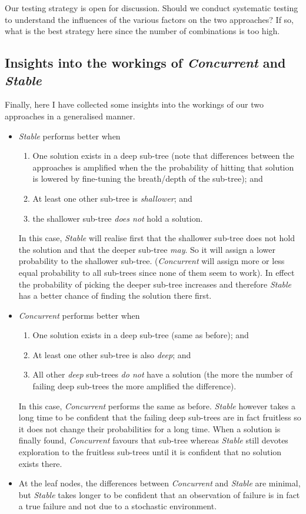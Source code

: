 \documentclass[a4paper]{article}
\newcommand{\cc}{\emph{Concurrent}\xspace}
\newcommand{\st}{\emph{Stable}\xspace}
\begin{document}
Our testing strategy is open for discussion. Should we conduct systematic testing to understand the influences of the various factors on the two approaches? If so, what is the best strategy here since the number of combinations is too high.

\subsection{Insights into the workings of \cc and \st}

Finally, here I have collected some insights into the workings of our two approaches in a generalised manner.

\begin{itemize}
\item \st performs better when
\begin{enumerate}
\item One solution exists in a deep sub-tree (note that differences between the approaches is amplified when the the probability of hitting that solution is lowered by fine-tuning the breath/depth of the sub-tree); and
\item At least one other sub-tree is \emph{shallower}; and
\item the shallower sub-tree \emph{does not} hold a solution.
\end{enumerate}

In this case, \st will realise first that the shallower sub-tree does not hold the solution and that the deeper sub-tree \emph{may}. So it will assign a lower probability to the shallower sub-tree. (\cc will assign more or less equal probability to all sub-trees since none of them seem to work). In effect the probability of picking the deeper sub-tree increases and therefore \st has a better chance of finding the solution there first.

\item \cc performs better when
\begin{enumerate}
\item One solution exists in a deep sub-tree (same as before); and
\item At least one other sub-tree is also \emph{deep}; and
\item All other \emph{deep} sub-trees \emph{do not} have a solution (the more the number of failing deep sub-trees the more amplified the difference).
\end{enumerate}

In this case, \cc performs the same as before. \st however takes a long time to be confident that the failing deep sub-trees are in fact fruitless so it does not change their probabilities for a long time. When a solution is finally found, \cc favours that sub-tree whereas \st still devotes exploration to the fruitless sub-trees until it is confident that no solution exists there.

\item At the leaf nodes, the differences between \cc and \st are minimal, but \st takes longer to be confident that an observation of failure is in fact a true failure and not due to a stochastic environment.

\end{itemize}
\end{document}
